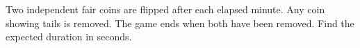 Two independent fair coins are flipped after each elapsed minute. Any coin showing tails is removed. The game ends when both have been removed. Find the expected duration in seconds.
